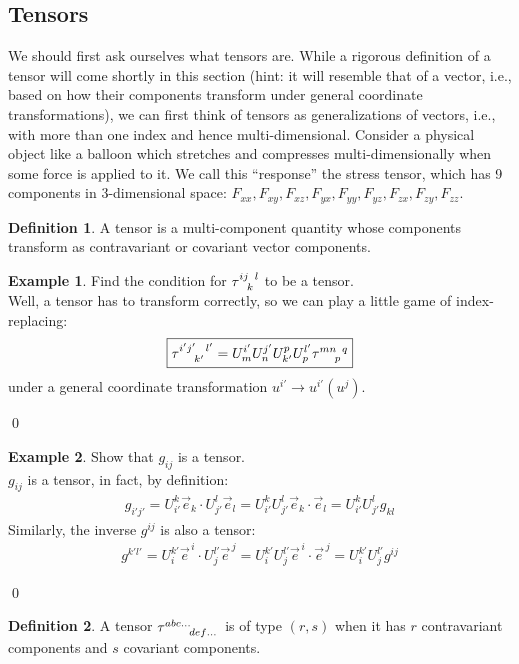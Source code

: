 \documentclass{book}
\theoremstyle{definition}
\newtheorem{defn}{Definition}[section]
\newtheorem{exmp}{Example}[section]
\begin{document}
\subsection{Tensors}
We should first ask ourselves what tensors are. While a rigorous definition of a tensor will come shortly in this section (hint: it will resemble that of a vector, i.e., based on how their components transform under general coordinate transformations), we can first think of tensors as generalizations of vectors, i.e., with more than one index and hence multi-dimensional. Consider a physical object like a balloon which stretches and compresses multi-dimensionally when some force is applied to it. We call this ``response'' the stress tensor, which has 9 components in 3-dimensional space: $F_{xx}, F_{xy}, F_{xz}, F_{yx}, F_{yy}, F_{yz}, F_{zx}, F_{zy}, F_{zz}$.  
\begin{defn}
	A tensor is a multi-component quantity whose components transform as contravariant or covariant vector components.
\end{defn}
\begin{exmp}
	Find the condition for $\tensor{\tau}{^{ij}_k^l}$ to be a tensor.\\
	
	Well, a tensor has to transform correctly, so we can play a little game of index-replacing:
	\begin{align*}
	\boxed{\tensor{\tau}{^{i'j'}_{k'}^{l'}} = U^{i'}_mU^{j'}_nU^p_{k'}U^{l'}_p\tensor{\tau}{^{mn}_{p}^{q}}}
	\end{align*}
	under a general coordinate transformation $u^{i'} \rightarrow u^{i'}(u^j)$. 
\end{exmp}\qed
\begin{exmp}
	Show that $g_{ij}$ is a tensor.\\
	
	$g_{ij}$ is a tensor, in fact, by definition:
	\begin{align*}
	\boxed{g_{i'j'} = U^k_{i'}\vec{e}_k \cdot U^l_{j'}\vec{e}_l = U^k_{i'}U^l_{j'}\vec{e}_k \cdot\vec{e}_l = U^k_{i'}U^l_{j'}g_{kl}}
	\end{align*} 
	Similarly, the inverse $g^{ij}$ is also a tensor:
	\begin{align*}
	\boxed{g^{k'l'} = U^{k'}_{i}\vec{e}^{\,i} \cdot U^{l'}_{j}\vec{e}^{\,j} = U^{k'}_iU^{l'}_{j}\vec{e}^{\,i} \cdot\vec{e}^{\,j} = U^{k'}_{i}U^{l'}_{j}g^{ij}}
	\end{align*}
\end{exmp}\qed
\begin{defn}
	A tensor $\tensor{\tau}{^{abc\dots}_{def\dots}}$ is of type $(r,s)$ when it has $r$ contravariant components and $s$ covariant components. 
\end{defn}
\end{document}
